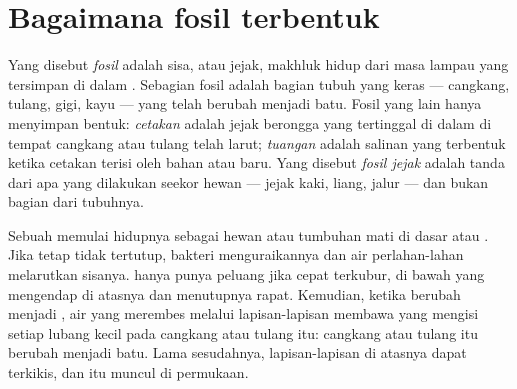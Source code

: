 \section{Bagaimana fosil terbentuk}

\begin{definition}[Fosil]\label{def:g7:sediments-and-fossils:fossil}
Yang disebut \emph{fosil} adalah sisa, atau jejak, makhluk
hidup dari masa lampau yang tersimpan di dalam . Sebagian fosil
adalah bagian tubuh yang keras --- cangkang, tulang, gigi, kayu --- yang
telah berubah menjadi batu. Fosil yang lain hanya menyimpan bentuk:
\emph{cetakan} adalah jejak berongga yang tertinggal
di dalam  di tempat cangkang atau tulang telah larut;
\emph{tuangan} adalah salinan yang terbentuk ketika
cetakan terisi oleh bahan  atau  baru. Yang disebut
\emph{fosil jejak} adalah tanda dari apa yang dilakukan
seekor hewan --- jejak kaki, liang, jalur --- dan bukan bagian dari
tubuhnya.
\end{definition}

Sebuah  memulai hidupnya sebagai hewan atau tumbuhan mati di dasar
 atau . Jika tetap tidak tertutup, bakteri menguraikannya dan air
perlahan-lahan melarutkan sisanya.  hanya punya peluang jika cepat
terkubur, di bawah  yang mengendap di atasnya dan menutupnya rapat.
Kemudian, ketika  berubah menjadi , air yang merembes melalui
lapisan-lapisan membawa  yang mengisi setiap lubang kecil pada
cangkang atau tulang itu: cangkang atau tulang itu berubah menjadi batu.
Lama sesudahnya, lapisan-lapisan di atasnya dapat terkikis, dan  itu
muncul di permukaan.

